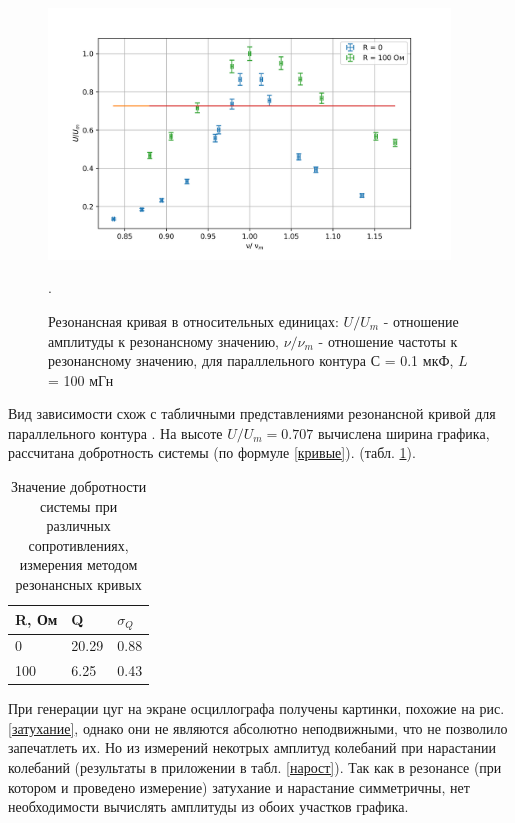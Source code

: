\documentclass[a4paper,12pt]{article} %
\begin{document}
\begin{figure}[h!]
\begin{center}
\includegraphics[width=0.95\textwidth]{graf}
\caption{Резонансная кривая в относительных единицах: $U/U_m$ - отношение амплитуды к резонансному значению, $\nu/\nu_m$ - отношение частоты к резонансному значению, для параллельного контура $С $ = 0.1 мкФ, $L$ = 100 мГн} \label{график}.
\end{center}
\end{figure} 

Вид зависимости схож с табличными представлениями резонансной кривой для параллельного контура \cite{labnik}. На высоте $U/U_m = 0.707$ вычислена ширина графика, рассчитана добротность системы (по формуле \ref{кривые}). (табл. \ref{кривые_табл}).
\begin{table}[h!]
\caption{Значение добротности системы при различных сопротивлениях, измерения методом резонансных кривых}
\label{кривые_табл}
\begin{tabular}{|l|l|l|}
\hline
R, Ом & Q     & $\sigma_Q$ \\ \hline
0     & 20.29 & 0.88       \\ \hline
100   & 6.25  & 0.43       \\ \hline
\end{tabular}
\end{table}

При генерации цуг на экране осциллографа получены картинки, похожие на рис. \ref{затухание}, однако они не являются абсолютно неподвижными, что не позволило запечатлеть их. Но из измерений некотрых амплитуд колебаний при нарастании колебаний (результаты в приложении в табл.  \ref{нарост}). Так как в резонансе (при котором и проведено измерение) затухание и нарастание симметричны, нет необходимости вычислять амплитуды из обоих участков графика.
\end{document}
